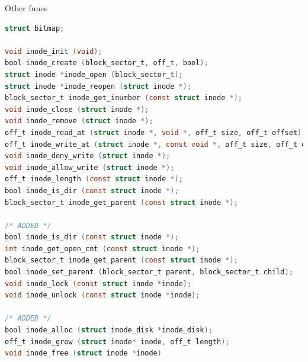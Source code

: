 \documentclass[10pt]{beamer}
\begin{document}
\begin{frame}[fragile]{Other funcs}
\begin{lstlisting}[language=C]
struct bitmap;

void inode_init (void);
bool inode_create (block_sector_t, off_t, bool);
struct inode *inode_open (block_sector_t);
struct inode *inode_reopen (struct inode *);
block_sector_t inode_get_inumber (const struct inode *);
void inode_close (struct inode *);
void inode_remove (struct inode *);
off_t inode_read_at (struct inode *, void *, off_t size, off_t offset);
off_t inode_write_at (struct inode *, const void *, off_t size, off_t offset);
void inode_deny_write (struct inode *);
void inode_allow_write (struct inode *);
off_t inode_length (const struct inode *);
bool inode_is_dir (const struct inode *);
block_sector_t inode_get_parent (const struct inode *);

/* ADDED */
bool inode_is_dir (const struct inode *);
int inode_get_open_cnt (const struct inode *);
block_sector_t inode_get_parent (const struct inode *);
bool inode_set_parent (block_sector_t parent, block_sector_t child);
void inode_lock (const struct inode *inode);
void inode_unlock (const struct inode *inode);

/* ADDED */
bool inode_alloc (struct inode_disk *inode_disk);
off_t inode_grow (struct inode* inode, off_t length);
void inode_free (struct inode *inode)
\end{lstlisting}
\end{frame}
\end{document}
